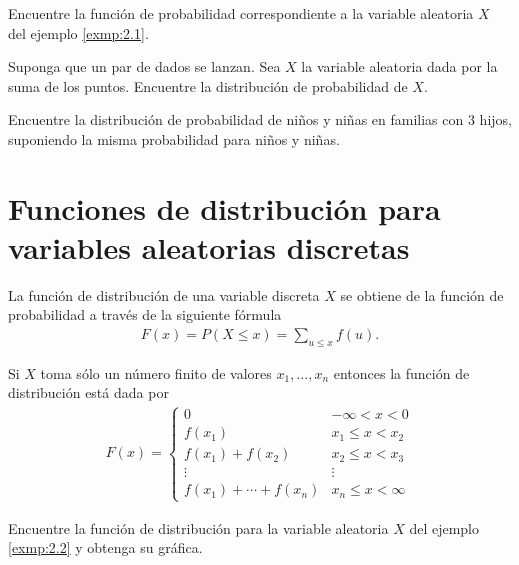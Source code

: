 	\begin{ejemplo}
		\label{exmp:0.2.2}
		Encuentre la función de probabilidad correspondiente a la variable aleatoria $X$ del ejemplo \ref{exmp:2.1}.
	\end{ejemplo}



 \begin{ejemplo}
  \label{sol:0.2.1}
  Suponga que un par de dados se lanzan. Sea $X$ la variable aleatoria dada por la suma de los puntos. Encuentre la distribución de probabilidad de $X.$
 \end{ejemplo}



 \begin{ejemplo}
  \label{sol:0.2.2}
  Encuentre la distribución de probabilidad de niños y niñas en familias con 3 hijos, suponiendo la misma probabilidad para niños y niñas.
 \end{ejemplo}



\section{Funciones de distribución para variables aleatorias discretas}


	La función de distribución de una variable discreta $X$ se obtiene de la función de probabilidad a través de la siguiente fórmula
	\begin{align}
		\label{eq:0.2.4}
		F(x) = P(X\leq x) = \sum_{u \leq x} f(u).
	\end{align}



	Si $X$ toma sólo un número finito de valores $x_{1},...,x_{n}$ entonces la función de distribución está dada por
	\begin{align}
		\label{eq:0.2.5}
		F(x)=
		\begin{cases}
			0 & -\infty < x < 0 \\
			f(x_{1}) & x_{1} \leq x < x_{2} \\
			f(x_{1})+f(x_{2}) & x_{2} \leq x < x_{3} \\
			\vdots & \vdots \\
			f(x_{1})+\cdots+f(x_{n}) & x_{n} \leq x < \infty
		\end{cases}
	\end{align}



	\begin{ejemplo}
		\label{exmp:0.2.3}
		Encuentre la función de distribución para la variable aleatoria $X$ del ejemplo \ref{exmp:2.2} y obtenga su gráfica.
	\end{ejemplo}



